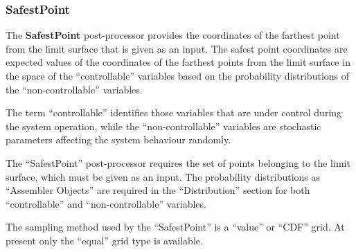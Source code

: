 \subsubsection{SafestPoint}
\label{SafestPoint}
The \textbf{SafestPoint} post-processor provides the coordinates of the farthest
point from the limit surface that is given as an input.
%
The safest point coordinates are expected values of the coordinates of the
farthest points from the limit surface in the space of the ``controllable''
variables based on the probability distributions of the ``non-controllable''
variables.

The term ``controllable'' identifies those variables that are under control
during the system operation, while the ``non-controllable'' variables are
stochastic parameters affecting the system behaviour randomly.

The ``SafestPoint'' post-processor requires the set of points belonging to the
limit surface, which must be given as an input.
%
The probability distributions as ``Assembler Objects'' are required in the
``Distribution'' section for both ``controllable'' and ``non-controllable''
variables.

The sampling method used by the ``SafestPoint'' is a ``value'' or ``CDF'' grid.
%
At present only the ``equal'' grid type is available.



